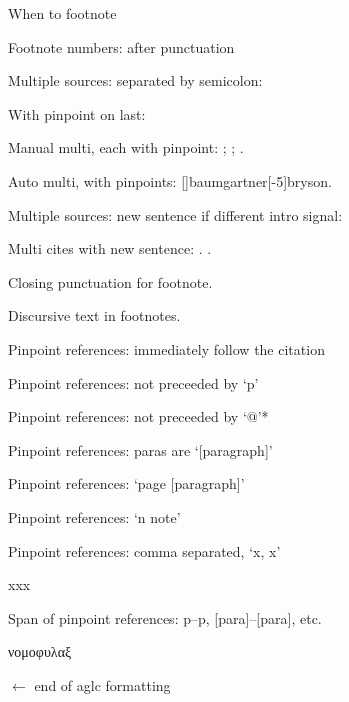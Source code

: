 
{
\renewcommand\lguide{aglc}





 When to footnote

 Footnote numbers: after punctuation

 Multiple sources: separated by semicolon:


With pinpoint on last: 

Manual multi, each with pinpoint: ; ; .

Auto multi, with pinpoints: []{baumgartner}[-5]{bryson}.


 Multiple sources: new sentence if different intro signal:

Multi cites with new sentence: . .

 Closing punctuation for footnote.

 Discursive text in footnotes.

 Pinpoint references: immediately follow the citation

 Pinpoint references: not preceeded by `p'

 Pinpoint references: not preceeded by `@'*

 Pinpoint references: paras are `[paragraph]'

 Pinpoint references: `page [paragraph]'

 Pinpoint references: `n note'

 Pinpoint references: comma separated, `x, x'

xxx




 Span of pinpoint references: p--p, [para]--[para], etc.

νομοφυλαξ

}$\leftarrow$ end of aglc formatting

